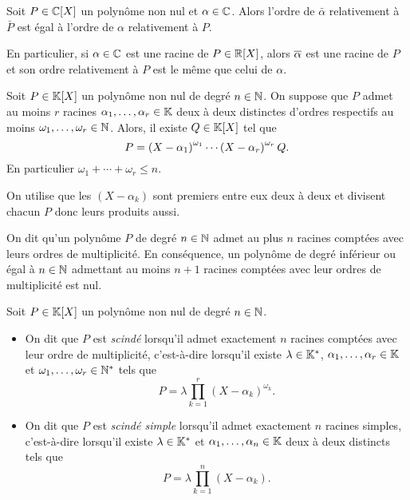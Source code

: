 \documentclass{magnolia}
\begin{document}
\begin{proposition}
Soit $P\in\polyC$ un polynôme non nul et $\alpha\in\mathbb{C}$. Alors l'ordre de $\bar{\alpha}$
relativement à $\bar{P}$ est égal à l'ordre de $\alpha$ relativement à $P$.
\end{proposition}

\begin{remarqueUnique}
\remarque En particulier, si $\alpha\in\mathbb{C}$ est une racine de $P\in\polyR$, alors $\overline{\alpha}$ est
  une racine de $P$ et son ordre relativement à $P$ est le même que celui de $\alpha$.
\end{remarqueUnique}

\begin{proposition}
Soit $P\in\polyK$ un polynôme non nul de degré $n\in\mathbb{N}$. On suppose que $P$ admet
au moins $r$ racines $\alpha_1,\ldots,\alpha_r\in\mathbb{K}$ deux à deux distinctes d'ordres respectifs au moins $\omega_1,\ldots,\omega_r\in\mathbb{N}$.
Alors, il existe $Q\in\polyK$ tel que
\[P=\left(X-\alpha_1\right)^{\omega_1}\cdots\left(X-\alpha_r\right)^{\omega_r} Q.\]
En particulier $\omega_1+\cdots+\omega_r\leq n$. \end{proposition}

\begin{preuve}
On utilise que les $(X-\alpha_{k})$ sont premiers entre eux deux à deux et divisent chacun $P$ donc leurs produits aussi.
\end{preuve}

\begin{remarques}
\remarque On dit qu'un polynôme $P$  de degré $n\in\mathbb{N}$ admet au plus $n$ racines comptées avec leurs ordres de multiplicité.
\remarque En conséquence, un polynôme de degré inférieur ou égal à $n\in\mathbb{N}$ admettant au moins $n+1$ racines comptées
  avec leur ordres de multiplicité est nul.
\end{remarques}

\begin{definition}
Soit $P\in\polyK$ un polynôme non nul de degré $n\in\mathbb{N}$.
\begin{itemize}
\item On dit que $P$ est \emph{scindé} lorsqu'il admet exactement $n$ racines comptées avec
  leur ordre de multiplicité, c'est-à-dire lorsqu'il existe $\lambda\in\mathbb{K}^*$,
  $\alpha_1,\ldots,\alpha_r\in\mathbb{K}$ et $\omega_1,\ldots,\omega_r\in{\mathbb{N}^*}$ tels que
  \[P=\lambda\prod_{k=1}^r(X-\alpha_k)^{\omega_k}.\]
\item On dit que $P$ est \emph{scindé simple} lorsqu'il admet exactement $n$ racines simples,
  c'est-à-dire lorsqu'il existe
  $\lambda\in\mathbb{K}^*$ et $\alpha_1,\ldots,\alpha_n\in\mathbb{K}$ deux à deux distincts tels que
  \[P=\lambda\prod_{k=1}^n(X-\alpha_k).\]
\end{itemize}
\end{definition}
\end{document}
